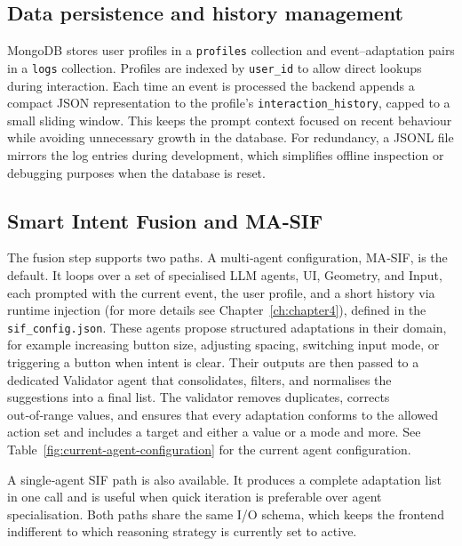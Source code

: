 \subsection{Data persistence and history management}
MongoDB stores user profiles in a \texttt{profiles} collection and event–adaptation pairs in a \texttt{logs} collection. Profiles are indexed by \texttt{user\_id} to allow direct lookups during interaction. Each time an event is processed the backend appends a compact JSON representation to the profile’s \texttt{interaction\_history}, capped to a small sliding window. This keeps the prompt context focused on recent behaviour while avoiding unnecessary growth in the database. For redundancy, a JSONL file mirrors the log entries during development, which simplifies offline inspection or debugging purposes when the database is reset.

\subsection{Smart Intent Fusion and MA‑SIF}
The fusion step supports two paths. A multi‑agent configuration, MA‑SIF, is the default. It loops over a set of specialised LLM agents, UI, Geometry, and Input, each prompted with the current event, the user profile, and a short history via runtime injection (for more details see Chapter~\ref{ch:chapter4}), defined in the \texttt{sif\_config.json}. These agents propose structured adaptations in their domain, for example increasing button size, adjusting spacing, switching input mode, or triggering a button when intent is clear. Their outputs are then passed to a dedicated Validator agent that consolidates, filters, and normalises the suggestions into a final list. The validator removes duplicates, corrects out‑of‑range values, and ensures that every adaptation conforms to the allowed action set and includes a target and either a value or a mode and more. See Table~\ref{fig:current-agent-configuration} for the current agent configuration.

A single‑agent SIF path is also available. It produces a complete adaptation list in one call and is useful when quick iteration is preferable over agent specialisation. Both paths share the same I/O schema, which keeps the frontend indifferent to which reasoning strategy is currently set to active.

